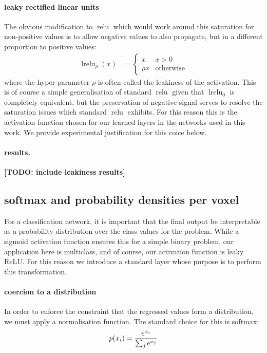 \documentclass[msc]{infthesis}
\newcommand{\TODO}[1]{\textbf{[TODO: {#1}]}}
\newcommand{\relu}{\operatorname{relu}}
\newcommand{\lrelu}{\operatorname{lrelu}}
\begin{document}
\paragraph*{leaky rectified linear units}
%
The obvious modification to \(\relu\) which would work around this saturation for non-positive
values is to allow negative values to also propagate, but in a different proportion to positive
values:
\begin{align}
  \label{eq:lrelu}
  \lrelu_{\rho}(x)
  &=
    \begin{cases}
      x & x > 0 \\
      \rho x & \text{otherwise}
    \end{cases}
\end{align}
%
where the hyper-parameter \(\rho\) is often called the leakiness of the activation.  This is of
course a simple generalisation of standard \(\relu\) given that \(\lrelu_0\) is completely equivalent,
but the preservation of negative signal serves to resolve the saturation issues which standard
\(\relu\) exhibits.  For this reason this is the activation function chosen for our learned layers
in the networks used in this work.  We provide experimental justification for this coice below.


\paragraph*{results.}
\TODO{include leakiness results}



\subsection{softmax and probability densities per voxel}
\label{sec:classification:3-2}

For a classification network, it is important that the final output be interpretable as a
probability distribution over the class values for the problem.  While a sigmoid activation
function ensures this for a simple binary problem, our application here is multiclass, and
of course, our activation function is leaky ReLU.  For this reason we introduce a standard
layer whose purpose is to perform this transformation.


\paragraph*{coercion to a distribution}
\label{sec:classification:3-2-1}
In order to enforce the constraint that the regressed values form a distribution, we must
apply a normalisation function.  The standard choice for this is softmax:
%
\begin{align}
p( x_i ) = { e^{x_i} \over \sum_{j} e^{x_j} }
\end{align}
%
\end{document}
